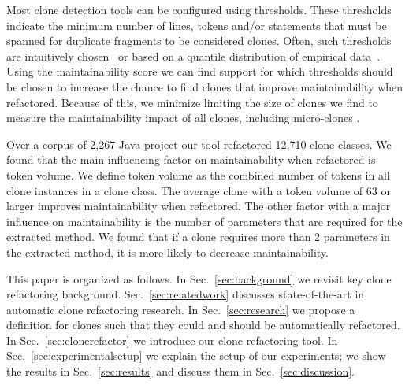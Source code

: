 \documentclass[sigconf,review,anonymous]{acmart}
\begin{document}
Most clone detection tools can be configured using thresholds. These thresholds indicate the minimum number of lines, tokens and/or statements that must be spanned for duplicate fragments to be considered clones. Often, such thresholds are intuitively chosen~\cite{li2006cp, roy2009mutation} or based on a quantile distribution of empirical data~\cite{alves2010deriving}. Using the maintainability score we can find support for which thresholds should be chosen to increase the chance to find clones that improve maintainability when refactored. Because of this, we minimize limiting the size of clones we find to measure the maintainability impact of all clones, including micro-clones \cite{mondai2018micro}.

Over a corpus of 2,267 Java project our tool refactored 12,710 clone classes. We found that the main influencing factor on maintainability when refactored is token volume. We define token volume as the combined number of tokens in all clone instances in a clone class. %
The average clone with a token volume of 63 or larger improves maintainability when refactored. The other factor with a major influence on maintainability is the number of parameters that are required for the extracted method. We found that if a clone requires more than 2 parameters in the extracted method, it is more likely to decrease maintainability.

This paper is organized as follows. In Sec.~\ref{sec:background} we revisit key clone refactoring background. Sec.~\ref{sec:relatedwork} discusses state-of-the-art in automatic clone refactoring research. In Sec.~\ref{sec:research} we propose a definition for clones such that they could and should be automatically refactored. In Sec.~\ref{sec:clonerefactor} we introduce our clone refactoring tool. In Sec.~\ref{sec:experimentalsetup} we explain the setup of our experiments; we show the results in Sec.~\ref{sec:results} and discuss them in Sec.~\ref{sec:discussion}.
\end{document}
